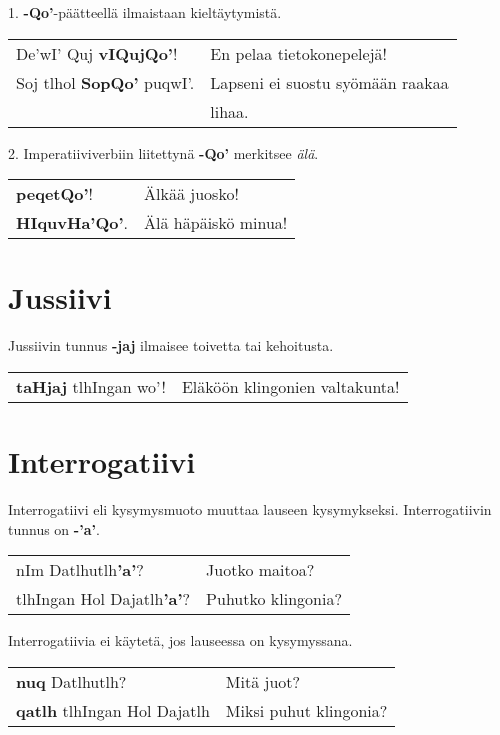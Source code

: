 \documentclass{book}
\begin{document}
1. \textbf{-Qo'}-päätteellä ilmaistaan kieltäytymistä.

\begin{tabular}{l l}
    De'wI' Quj \textbf{vIQujQo'}! & En pelaa tietokonepelejä! \\
    Soj tlhol \textbf{SopQo'} puqwI'. & Lapseni ei suostu syömään raakaa \\
    & lihaa. \\
\end{tabular}

2. Imperatiiviverbiin liitettynä \textbf{-Qo'} merkitsee \textit{älä}.

\begin{tabular}{l l}
    \textbf{peqetQo'}! & Älkää juosko! \\
    \textbf{HIquvHa'Qo'}. & Älä häpäiskö minua! \\
\end{tabular}

\section{Jussiivi}

Jussiivin tunnus \textbf{-jaj} ilmaisee toivetta tai kehoitusta.

\begin{tabular}{l l}
    \textbf{taHjaj} tlhIngan wo'! & Eläköön klingonien valtakunta! \\
\end{tabular}

\section{Interrogatiivi}

Interrogatiivi eli kysymysmuoto muuttaa lauseen kysymykseksi.
Interrogatiivin tunnus on \textbf{-'a'}.

\begin{tabular}{l l}
    nIm Datlhutlh\textbf{'a'}? & Juotko maitoa? \\
    tlhIngan Hol Dajatlh\textbf{'a'}? & Puhutko klingonia? \\
\end{tabular}

Interrogatiivia ei käytetä, jos lauseessa on kysymyssana.

\begin{tabular}{l l}
    \textbf{nuq} Datlhutlh? & Mitä juot? \\
    \textbf{qatlh} tlhIngan Hol Dajatlh & Miksi puhut klingonia? \\
\end{tabular}
\end{document}
